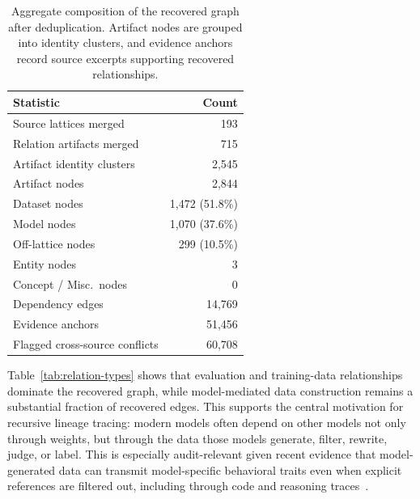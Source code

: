 \begin{table}[t]
\centering
\small
\caption{Aggregate composition of the recovered graph after deduplication. Artifact nodes are grouped into identity clusters, and evidence anchors record source excerpts supporting recovered relationships.}
\label{tab:graph-composition}
\begin{tabular}{lr}
\toprule
Statistic & Count \\
\midrule
Source lattices merged & 193 \\
Relation artifacts merged & 715 \\
Artifact identity clusters & 2,545 \\
Artifact nodes & 2,844 \\
\quad Dataset nodes & 1,472 \; (51.8\%) \\
\quad Model nodes & 1,070 \; (37.6\%) \\
\quad Off-lattice nodes & 299 \; (10.5\%) \\
\quad Entity nodes & 3 \\
\quad Concept / Misc.\ nodes & 0 \\
\midrule
Dependency edges & 14,769 \\
Evidence anchors & 51,456 \\
Flagged cross-source conflicts & 60,708 \\
\bottomrule
\end{tabular}
\end{table}

Table~\ref{tab:relation-types} shows that evaluation and training-data relationships dominate the recovered graph, while model-mediated data construction remains a substantial fraction of recovered edges. This supports the central motivation for recursive lineage tracing: modern models often depend on other models not only through weights, but through the data those models generate, filter, rewrite, judge, or label. This is especially audit-relevant given recent evidence that model-generated data can transmit model-specific behavioral traits even when explicit references are filtered out, including through code and reasoning traces~\cite{cloud2025subliminallearninglanguagemodels}.

